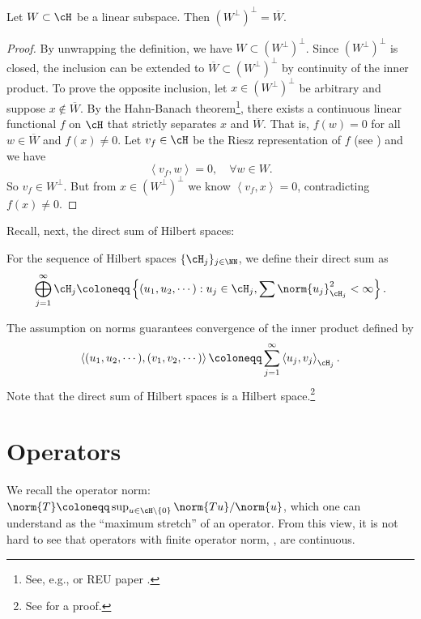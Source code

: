 \documentclass[oneside,reqno,letterpaper]{amsart}
\begin{document}
\begin{proposition}
\label{thm:double-perp}
  Let \(W \subset \cH\) be a linear subspace. 
  Then \((W^\perp)^\perp = \overline{W}\). 
\end{proposition}
\begin{proof}
  By unwrapping the definition, we have \(W \subset (W^\perp)^\perp\). 
  Since \((W^\perp)^\perp\) is closed, the inclusion can be extended to \(\overline{W} \subset (W^\perp)^\perp\) by continuity of the inner product. 
  To prove the opposite inclusion, let \(x \in (W^\perp)^\perp\) be arbitrary and suppose \(x \not\in \overline{W}\). 
  By the Hahn-Banach theorem\footnote{See, e.g., \cite[Chapter 1]{brezis2011functional} or REU paper \cite{peng2014hahn}. }, there exists a continuous linear functional \(f\) on \(\cH\) that strictly separates \(x\) and \(\overline{W}\).
  That is, \(f(w) = 0\) for all \(w \in \overline{W}\) and \(f(x) \neq 0\). 
  Let \(v_f \in \cH\) be the Riesz representation of \(f\) (see ) and we have 
  \[
    \left< v_f, w \right> = 0, \quad \forall w \in W . 
  \] 
  So \(v_f \in W^\perp\). 
  But from \(x \in (W^\perp)^\perp\) we know \(\left< v_f, x \right> = 0\), contradicting \(f(x) \neq 0\). 
\end{proof}


Recall, next, the direct sum of Hilbert spaces:
\begin{definition}
  For the sequence of Hilbert spaces \(\{\cH_j\}_{j \in \NN}\), we define their direct sum as 
  \[
    \bigoplus_{j = 1}^{\infty} \cH_j 
    \coloneqq \left\{ (u_1, u_2, \cdots ): u_j \in \cH_j, \sum \norm{u_j}_{\cH_j}^2 < \infty \right\} . 
  \] 
\end{definition}

The assumption on norms guarantees convergence of the inner product defined by
\[
  \left< (u_1, u_2, \cdots ), (v_1, v_2, \cdots ) \right> \coloneqq \sum_{j =1}^{\infty} \left< u_j, v_j \right>_{\cH_j} . 
\] 
Note that the direct sum of Hilbert spaces is a Hilbert space.\footnote{See \cite[p.~24]{conway2007functional} for a proof. }



\section{Operators}
\label{sec:operators}

We recall the operator norm: \(\norm{T} \coloneqq \sup_{u \in \cH \setminus \{0\}} \norm{T u} / \norm{u}\), which one can understand as the ``maximum stretch'' of an operator. 
From this view, it is not hard to see that operators with finite operator norm, , are continuous. 
\end{document}
